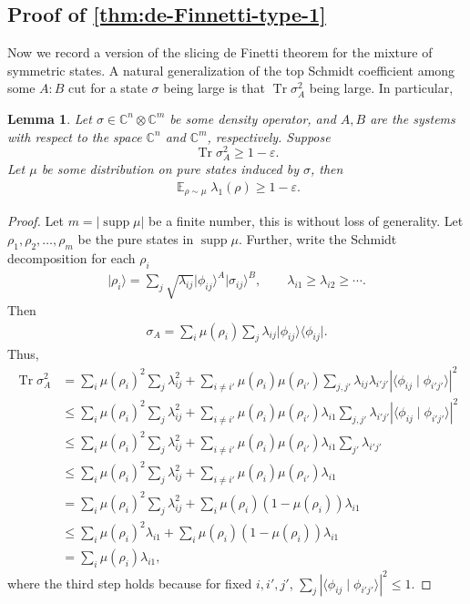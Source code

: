 \documentclass[10pt,a4paper]{article}
\newtheorem{lemma}[theorem]{Lemma}
\theoremstyle{remark}
\def\epsilon{\varepsilon}
\newcommand{\C}{{\mathbb C}}
\DeclareMathOperator\supp{supp}
\newcommand{\1}[1]{\mathds{1}{[#1]}}
\newcommand{\ket}[1]{\lvert #1\rangle}
\DeclareMathOperator*{\Exp}{\mathbb{E}}
\newcommand{\trace}{\operatorname{Tr}}
\newcommand{\bra}[1]{\langle#1|}
\numberwithin{equation}{section}
\begin{document}
\subsection{Proof of \cref{thm:de-Finnetti-type-1}}
Now we record a version of the slicing de Finetti theorem for the mixture of symmetric states. A natural generalization of the top Schmidt coefficient among some $A:B$ cut for a state $\sigma$ being large is that $\trace{\sigma_A^2} $ being large.
In particular,
\begin{lemma}\label{lem:trace-reduced-den-squared}
Let $\sigma\in\C^n\otimes\C^m$ be some density operator, and $A,B$ are the systems with respect to the space  $\C^n$ and $\C^m$, respectively. Suppose
\begin{equation*}
    \trace \sigma_A^2 \ge 1-\epsilon.
\end{equation*}
Let $\mu$ be some distribution on pure states induced by $\sigma$, then
\begin{align*}
    \Exp_{\rho\sim\mu} \lambda_1(\rho) \ge 1-\epsilon.
\end{align*}
\end{lemma}
\begin{proof}
Let $m=|\supp\mu|$ be a finite number, this is without loss of generality.  Let $\rho_1, \rho_2,\ldots, \rho_m$ be the pure states in $\supp\mu$. Further, write the Schmidt decomposition for each $\rho_i$
\begin{align*}
    \ket{\rho_i} = \sum_{j} \sqrt{\lambda_{ij}}\ket{\phi_{ij}}^{A}\ket{\sigma_{ij}}^{B},\qquad \lambda_{i1} \ge \lambda_{i2}\ge\cdots.
\end{align*}
Then
\begin{align*}
    \sigma_A = \sum_i \mu(\rho_i) \sum_j \lambda_{ij} \ket{\phi_{ij}}\bra{\phi_{ij}}.
\end{align*}
Thus,
\begin{align}
    \trace{\sigma_{A}^2} 
    &= \sum_i \mu(\rho_i)^2 \sum_j \lambda_{ij}^2 +    \sum_{i\not=i'}\mu(\rho_i)\mu(\rho_{i'})\sum_{j,j'}\lambda_{ij}\lambda_{i'j'}|\langle \phi_{ij} \mid \phi_{i'j'}\rangle|^2
    \nonumber\\
    &\le \sum_i \mu(\rho_i)^2 \sum_j \lambda_{ij}^2 + \sum_{i\not=i'}\mu(\rho_i)\mu(\rho_{i'})\lambda_{i1}\sum_{j,j'}\lambda_{i'j'}|\langle \phi_{ij} \mid \phi_{i'j'}\rangle|^2
    \nonumber\\
    &\le \sum_i \mu(\rho_i)^2 \sum_j \lambda_{ij}^2 + \sum_{i\not=i'}\mu(\rho_i)\mu(\rho_{i'})\lambda_{i1}\sum_{j'}\lambda_{i'j'}
    \nonumber\\
    &\le \sum_i \mu(\rho_i)^2  \sum_j \lambda_{ij}^2 + \sum_{i\not=i'}\mu(\rho_i)\mu(\rho_{i'}) \lambda_{i1}
    \nonumber\\
    &=\sum_i \mu(\rho_i)^2\sum_j \lambda_{ij}^2 + \sum_i \mu(\rho_i)(1-\mu(\rho_i))\lambda_{i1}
    \nonumber\\
    &\le \sum_i \mu(\rho_i)^2 \lambda_{i1} + \sum_i \mu(\rho_i)(1-\mu(\rho_i))\lambda_{i1}
    \nonumber\\
    &= \sum_i \mu(\rho_i)\lambda_{i1},
    \nonumber
\end{align}
where the third step holds because for fixed $i,i',j'$,  $\sum_{j} |\langle\phi_{ij}\mid \phi_{i'j'}\rangle|^2\le 1.$
\end{proof}
\end{document}
